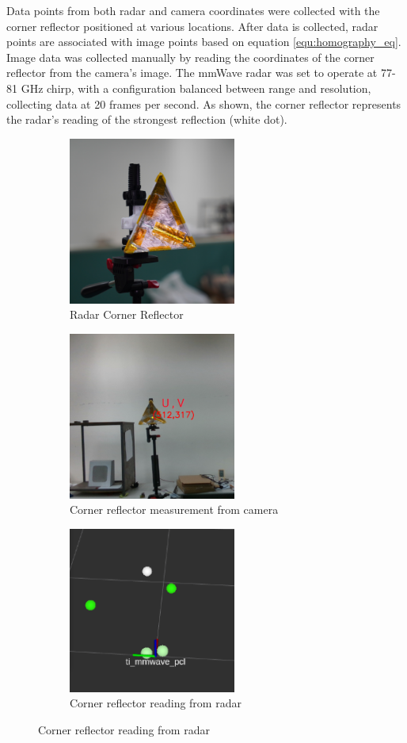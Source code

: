 Data points from both radar and camera coordinates were collected with the corner reflector positioned at various locations.
After data is collected, radar points are associated with image points based on equation \ref*{equ:homography_eq}.
Image data was collected manually by reading the coordinates of the corner reflector from the camera's image.
The mmWave radar was set to operate at 77-81 GHz chirp, 
with a configuration balanced between range and resolution, 
collecting data at 20 frames per second. 
As shown, the corner reflector represents the radar's reading of the strongest reflection (white dot).
\begin{figure}[hbpt]
    \centering
    \begin{subfigure}{0.25\linewidth}
        \includegraphics[width=5.5cm]{Figures/corner_reflector.jpg}
        \caption{Radar Corner Reflector}
        \label{subfig:corner_reflector_fig}
    \end{subfigure}
    \hfill
    \begin{subfigure}{0.25\linewidth}
        \centering
        \includegraphics[width=5.5cm]{Figures/camera_corner.png}
        \caption{Corner reflector measurement from camera}
        \label{subfig:camera_view_fig}
    \end{subfigure}
    \hfill
    \begin{subfigure}{0.25\linewidth}
        \centering
        \includegraphics[width=5.5cm]{Figures/radar_corner.png}
        \caption{Corner reflector reading from radar}
        \label{subfig:radar_view_fig}
    \end{subfigure}


\end{figure}
